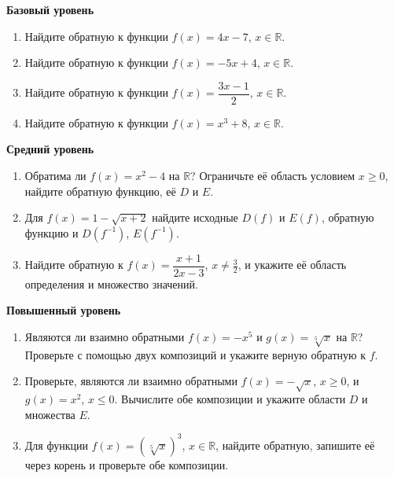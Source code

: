 \documentclass[a4paper,12pt]{article}
\newcommand{\R}{\mathbb{R}}
\begin{document}
\textbf{Базовый уровень}
\begin{enumerate}
\item Найдите обратную к функции \(f(x)=4x-7\), \(x\in\R\).
\item Найдите обратную к функции \(f(x)=-5x+4\), \(x\in\R\).
\item Найдите обратную к функции \(f(x)=\dfrac{3x-1}{2}\), \(x\in\R\).
\item Найдите обратную к функции \(f(x)=x^3+8\), \(x\in\R\).
\end{enumerate}

\textbf{Средний уровень}
\begin{enumerate}[resume]
\item Обратима ли \(f(x)=x^2-4\) на \(\R\)? Ограничьте её область условием \(x\ge0\), найдите обратную функцию, её \(D\) и \(E\).
\item Для \(f(x)=1-\sqrt{x+2}\) найдите исходные \(D(f)\) и \(E(f)\), обратную функцию и \(D(f^{-1})\), \(E(f^{-1})\).
\item Найдите обратную к \(f(x)=\dfrac{x+1}{2x-3}\), \(x\ne\frac32\), и укажите её область определения и множество значений.
\end{enumerate}

\textbf{Повышенный уровень}
\begin{enumerate}[resume]
\item Являются ли взаимно обратными \(f(x)=-x^5\) и \(g(x)=\sqrt[5]{x}\) на \(\R\)? Проверьте с помощью двух композиций и укажите верную обратную к \(f\).
\item Проверьте, являются ли взаимно обратными \(f(x)=-\sqrt{x}\), \(x\ge0\), и \(g(x)=x^2\), \(x\le0\). Вычислите обе композиции и укажите области \(D\) и множества \(E\).
\item Для функции \(f(x)=(\sqrt[5]{x})^3\), \(x\in\R\), найдите обратную, запишите её через корень и проверьте обе композиции.
\end{enumerate}
\end{document}
